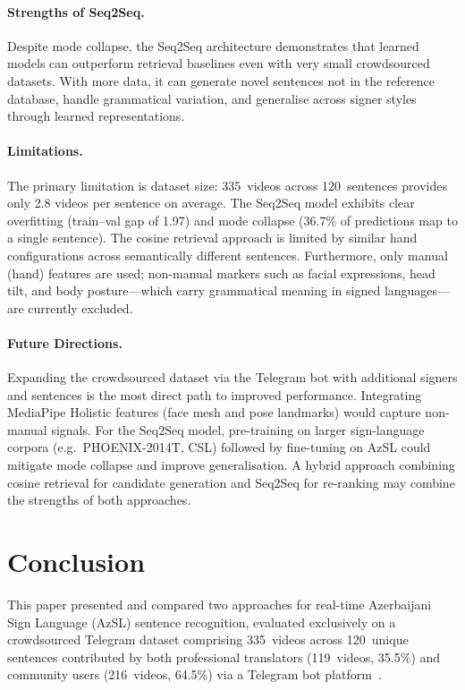 \documentclass[runningheads]{llncs}
\begin{document}
\paragraph{Strengths of Seq2Seq.}
Despite mode collapse, the Seq2Seq architecture demonstrates that
learned models can outperform retrieval baselines even with very
small crowdsourced datasets.
With more data, it can generate novel sentences not in the reference
database, handle grammatical variation, and generalise across signer
styles through learned representations.

\paragraph{Limitations.}
The primary limitation is dataset size: 335~videos across
120~sentences provides only 2.8 videos per sentence on average.
The Seq2Seq model exhibits clear overfitting (train--val gap of
1.97) and mode collapse (36.7\% of predictions map to a single
sentence).
The cosine retrieval approach is limited by similar hand
configurations across semantically different sentences.
Furthermore, only manual (hand) features are used; non-manual
markers such as facial expressions, head tilt, and body posture—which
carry grammatical meaning in signed languages—are currently excluded.

\paragraph{Future Directions.}
Expanding the crowdsourced dataset via the Telegram bot with
additional signers and sentences is the most direct path to
improved performance.
Integrating MediaPipe Holistic features (face mesh and pose
landmarks) would capture non-manual signals.
For the Seq2Seq model, pre-training on larger sign-language corpora
(e.g.\ PHOENIX-2014T, CSL) followed by fine-tuning on AzSL could
mitigate mode collapse and improve generalisation.
A hybrid approach combining cosine retrieval for candidate generation
and Seq2Seq for re-ranking may combine the strengths of both
approaches.

\section{Conclusion}\label{sec:conclusion}

This paper presented and compared two approaches for real-time
Azerbaijani Sign Language (AzSL) sentence recognition, evaluated
exclusively on a crowdsourced Telegram dataset comprising 335~videos
across 120~unique sentences contributed by both professional
translators (119~videos, 35.5\%) and community users
(216~videos, 64.5\%) via a Telegram bot
platform~\cite{mustafazada2025crowdsourcing}.
\end{document}
